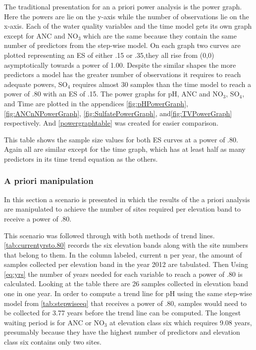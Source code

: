 The traditional presentation for an a priori power analysis is the power graph.
Here the powers are lie on the y-axis while the number of observations lie on the x-axis.
Each of the water quality variables and the time model gets its own graph except for ANC and NO$_3$ which are the same because they contain the same number of predictors from the step-wise model.
On each graph two curves are plotted representing an ES of either .15 or .35,they all rise from (0,0) asymptotically towards a power of 1.00.
Despite the similar shapes the more predictors a model has the greater number of  observations it requires to reach adequate powers, SO$_4$ requires almost 30 samples than the time model to reach a power of .80 with an ES of .15.
The power graphs for pH, ANC and NO$_3$, SO$_4$, and Time are plotted in the appendices \autoref{fig:pHPowerGraph}, \autoref{fig:ANCnNPowerGraph}, \autoref{fig:SulfatePowerGraph}, and\autoref{fig:TVPowerGraph} respectively.
And \autoref{powergraphtable} was created for easier comparison.



This table shows the sample size values for both ES curves at a power of .80.
Again all are similar except for the time graph, which has at least half as many predictors in its time trend equation as the others.

\subsubsection{A priori manipulation}

In this section a scenario is presented in which the results of the a priori analysis are manipulated to achieve the number of sites required per elevation band to receive a power of .80.


This scenario was followed through with both methods of trend lines.
\autoref{tab:currentyrsto.80} records the six elevation bands along with the site numbers that belong to them. 
 In the column labeled, current n per year, the amount of samples collected per elevation band in the year 2012 are tabulated.  
 Then Using \autoref{eq:yrs} the number of years needed for each variable to reach a power of .80 is calculated.
Looking at the table there are 26  samples collected in elevation band one in one year.  
In order to compute a trend line for pH using the same step-wise model from \autoref{tab:stepwiseeq} that receives a power of .80,  samples would need to be collected for 3.77 years before the trend line can be computed.   
The longest waiting period is for ANC or NO$_3$ at elevation class six which requires 9.08 years, presumably because they have the highest number of predictors and elevation class six contains only two sites. 

